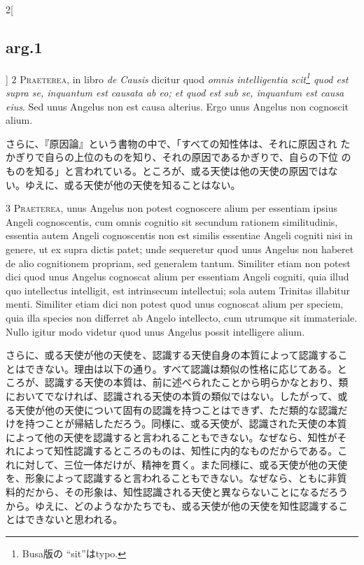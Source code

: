\documentclass[paper=a4paper,fontsize=10pt,jafontsize=9pt,titlepage]{jlreq}
\begin{document}
\begin{paracol}{2}[\subsection{arg.1}]
{\scshape 2 Praeterea}, in libro {\itshape de Causis} dicitur quod
{\itshape omnis intelligentia scit\footnote{Busa版の ``sit''はtypo.}
quod est supra se, inquantum est causata ab eo; et quod est sub se,
inquantum est causa eius}. Sed unus Angelus non est causa
alterius. Ergo unus Angelus non cognoscit alium.

\switchcolumn

さらに、『原因論』という書物の中で、「すべての知性体は、それに原因され
たかぎりで自らの上位のものを知り、それの原因であるかぎりで、自らの下位
のものを知る」と言われている。ところが、或る天使は他の天使の原因ではな
い。ゆえに、或る天使が他の天使を知ることはない。


{\scshape 3 Praeterea}, unus Angelus non potest cognoscere alium per
essentiam ipsius Angeli cognoscentis, cum omnis cognitio sit secundum
rationem similitudinis, essentia autem Angeli cognoscentis non est
similis essentiae Angeli cogniti nisi in genere, ut ex supra dictis
patet; unde sequeretur quod unus Angelus non haberet de alio
cognitionem propriam, sed generalem tantum. Similiter etiam non potest
dici quod unus Angelus cognoscat alium per essentiam Angeli cogniti,
quia illud quo intellectus intelligit, est intrinsecum intellectui;
sola autem Trinitas illabitur menti. Similiter etiam dici non potest
quod unus cognoscat alium per speciem, quia illa species non differret
ab Angelo intellecto, cum utrumque sit immateriale. Nullo igitur modo
videtur quod unus Angelus possit intelligere alium.

\switchcolumn

さらに、或る天使が他の天使を、認識する天使自身の本質によって認識するこ
とはできない。理由は以下の通り。すべて認識は類似の性格に応じてある。と
ころが、認識する天使の本質は、前に述べられたことから明らかなとおり、類
においてでなければ、認識される天使の本質の類似ではない。したがって、或
る天使が他の天使について固有の認識を持つことはできず、ただ類的な認識だ
けを持つことが帰結しただろう。同様に、或る天使が、認識された天使の本質
によって他の天使を認識すると言われることもできない。なぜなら、知性がそ
れによって知性認識するところのものは、知性に内的なものだからである。こ
れに対して、三位一体だけが、精神を貫く。また同様に、或る天使が他の天使
を、形象によって認識すると言われることもできない。なぜなら、ともに非質
料的だから、その形象は、知性認識される天使と異ならないことになるだろう
から。ゆえに、どのようなかたちでも、或る天使が他の天使を知性認識するこ
とはできないと思われる。


\end{paracol}
\end{document}
